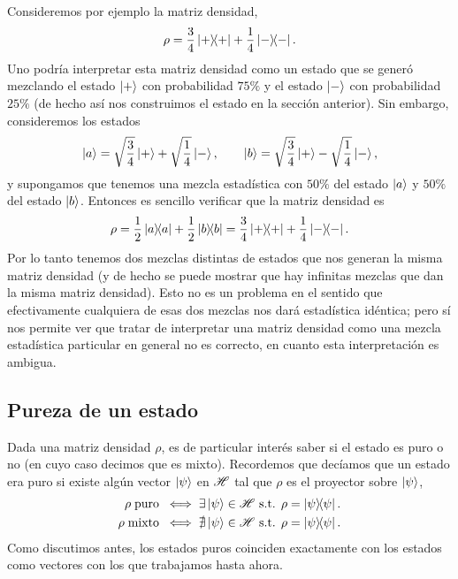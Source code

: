 \documentclass[10pt, a4paper]{article}
\numberwithin{equation}{subsection}
\begin{document}
Consideremos por ejemplo la matriz densidad,
\begin{equation}
  \rho = \frac{3}{4}\ketbra{+}{+} + \frac{1}{4}\ketbra{-}{-}.
\end{equation}
Uno podría interpretar esta matriz densidad como un estado que se generó
mezclando el estado $\ket{+}$ con probabilidad $75\%$ y el estado $\ket{-}$ con
probabilidad $25\%$ (de hecho así nos construimos el estado en la sección
anterior). Sin embargo, consideremos los estados
\begin{equation}
  \ket{a} = \sqrt{\frac{3}{4}}\ket{+} + \sqrt{\frac{1}{4}}\ket{-}, \qquad
  \ket{b} = \sqrt{\frac{3}{4}}\ket{+} - \sqrt{\frac{1}{4}}\ket{-},
\end{equation}
y supongamos que tenemos una mezcla estadística con $50\%$ del estado $\ket{a}$
y $50\%$ del estado $\ket{b}$. Entonces es sencillo verificar que la matriz
densidad es
\begin{equation}
  \rho
  = \frac{1}{2}\ketbra{a}{a} + \frac{1}{2}\ketbra{b}{b}
  = \frac{3}{4}\ketbra{+}{+} + \frac{1}{4}\ketbra{-}{-}.
\end{equation}
Por lo tanto tenemos dos mezclas distintas de estados que nos generan la misma
matriz densidad (y de hecho se puede mostrar que hay infinitas mezclas que dan
la misma matriz densidad). Esto no es un problema en el sentido que
efectivamente cualquiera de esas dos mezclas nos dará estadística idéntica;
pero sí nos permite ver que tratar de interpretar una matriz densidad como una
mezcla estadística particular en general no es correcto, en cuanto esta
interpretación es ambigua.

\subsection{Pureza de un estado}
Dada una matriz densidad $\rho$, es de particular interés saber si el estado es
puro o no (en cuyo caso decimos que es mixto). Recordemos que decíamos que un
estado era puro si existe algún vector $\ket{\psi}$ en $\mathscr{H}$ tal que
$\rho$ es el proyector sobre $\ket{\psi}$,
\begin{align}
  \rho \;\text{puro} \;\iff\; &\exists\ket{\psi}\in\Hilbert \text{ s.t. } \rho
    = \projector{\psi}. \\
  \rho \;\text{mixto} \;\iff\; &\nexists\ket{\psi}\in\Hilbert \text{ s.t. }
    \rho = \projector{\psi}.
\end{align}
Como discutimos antes, los estados puros coinciden exactamente con los estados
como vectores con los que trabajamos hasta ahora.
\end{document}
